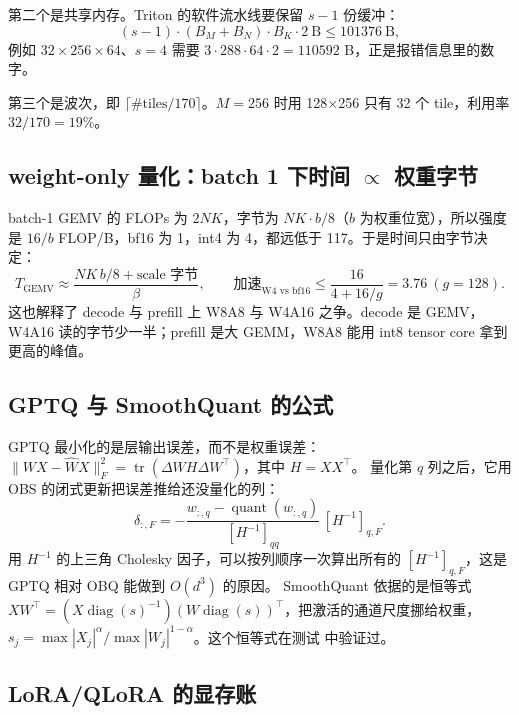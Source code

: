 \documentclass[11pt,a4paper]{ctexart}
\begin{document}
第二个是共享内存。Triton 的软件流水线要保留 $s-1$ 份缓冲：
\begin{equation}
(s-1)\cdot(B_M+B_N)\cdot B_K\cdot 2\ \text{B} \le 101376\ \text{B},
\end{equation}
例如 $32\times256\times64$、$s{=}4$ 需要 $3\cdot288\cdot64\cdot2 = 110592$ B，正是报错信息里的数字。

第三个是波次，即 $\lceil \#\text{tiles}/170\rceil$。$M{=}256$ 时用 128$\times$256 只有 32 个 tile，利用率 $32/170=19\%$。

\subsection{weight-only 量化：batch 1 下时间 $\propto$ 权重字节}

batch-1 GEMV 的 FLOPs 为 $2NK$，字节为 $NK\cdot b/8$（$b$ 为权重位宽），所以强度是 $16/b$ FLOP/B，bf16 为 1，int4 为 4，都远低于 117。于是时间只由字节决定：
\begin{equation}
T_{\text{GEMV}}\approx\frac{NK\,b/8+\text{scale 字节}}{\beta},\qquad \text{加速}_{\text{W4 vs bf16}}\le\frac{16}{4+16/g}=3.76\ (g=128).
\label{eq:w4bound}
\end{equation}
这也解释了 decode 与 prefill 上 W8A8 与 W4A16 之争。decode 是 GEMV，W4A16 读的字节少一半；prefill 是大 GEMM，W8A8 能用 int8 tensor core 拿到更高的峰值。

\subsection{GPTQ 与 SmoothQuant 的公式}

GPTQ 最小化的是层输出误差，而不是权重误差：$\|WX-\hat WX\|_F^2=\operatorname{tr}(\Delta W H\Delta W^\top)$，其中 $H=XX^\top$。
量化第 $q$ 列之后，它用 OBS 的闭式更新把误差推给还没量化的列：
\begin{equation}
\delta_{:,F}=-\frac{w_{:,q}-\operatorname{quant}(w_{:,q})}{[H^{-1}]_{qq}}\,[H^{-1}]_{q,F}.
\end{equation}
用 $H^{-1}$ 的上三角 Cholesky 因子，可以按列顺序一次算出所有的 $[H^{-1}]_{q,F}$，这是 GPTQ 相对 OBQ 能做到 $O(d^3)$ 的原因。
SmoothQuant 依据的是恒等式 $XW^\top=(X\operatorname{diag}(s)^{-1})(W\operatorname{diag}(s))^\top$，把激活的通道尺度挪给权重，$s_j=\max|X_j|^\alpha/\max|W_j|^{1-\alpha}$。这个恒等式在测试  中验证过。

\subsection{LoRA/QLoRA 的显存账}
\end{document}
